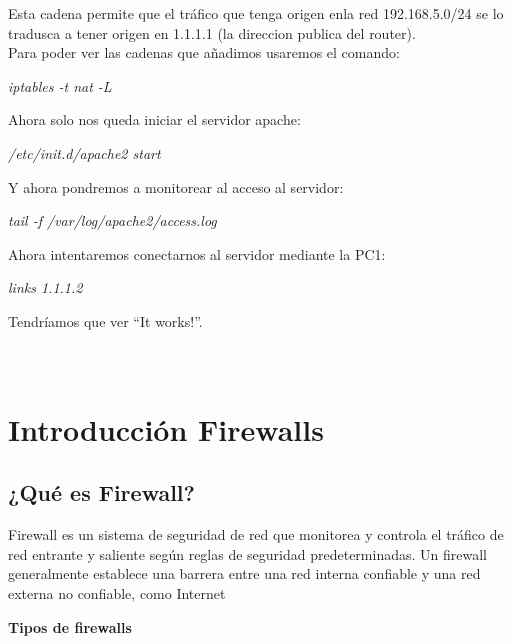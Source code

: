 \documentclass{article}
\begin{document}
Esta cadena permite que el tráfico que tenga origen enla red 192.168.5.0/24 se lo tradusca a tener origen en 1.1.1.1 (la direccion publica del router).\\
Para poder ver las cadenas que añadimos usaremos el comando: 

\begin{center}
	\textit{iptables -t nat -L}
\end{center}

Ahora solo nos queda iniciar el servidor apache:

\begin{center}
	\textit{/etc/init.d/apache2 start}
\end{center}

Y ahora pondremos a monitorear al acceso al servidor: 

\begin{center}
	\textit{tail -f /var/log/apache2/access.log}
\end{center}

Ahora intentaremos conectarnos al servidor mediante la PC1:

\begin{center}
	\textit{links 1.1.1.2}
\end{center}
Tendríamos que ver “It works!”.
\\\\ \hfill\\

\section*{Introducción Firewalls}

\subsection*{¿Qué es Firewall?}

\vspace{\baselineskip}
Firewall es un sistema de seguridad de red que monitorea y controla el tráfico de red entrante y saliente según reglas de seguridad predeterminadas. Un firewall generalmente establece una barrera entre una red interna confiable y una red externa no confiable, como Internet\par


\vspace{\baselineskip}

\vspace{\baselineskip}
\begin{center}
	{\fontsize{14pt}{16.8pt}\selectfont \textbf{Tipos de firewalls}\par}
\end{center}\par
\end{document}
